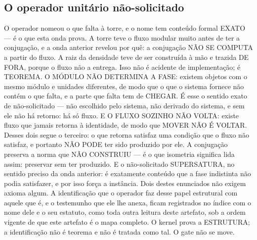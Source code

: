 \documentclass[11pt]{article}
\theoremstyle{definition}\newtheorem{deriv}{Derivação}
\begin{document}
\subsection*{O operador unit\'ario n\~ao-solicitado}O operador nomeou o que falta \`a torre, e o nome tem conte\'udo formal EXATO --- \'e o que esta onda prova. A torre teve o fluxo modular muito antes de ter a conjuga\c{c}\~ao, e a onda anterior revelou por qu\^e: a conjuga\c{c}\~ao N\~AO SE COMPUTA a partir do fluxo. A raiz da densidade teve de ser constru\'ida \`a m\~ao e trazida DE FORA, porque o fluxo n\~ao a entrega. Isso n\~ao \'e acidente de implementa\c{c}\~ao; \'e TEOREMA. O M\'ODULO N\~AO DETERMINA A FASE: existem objetos com o mesmo m\'odulo e unidades diferentes, de modo que o que o sistema fornece n\~ao cont\'em o que falta, e a parte que falta tem de CHEGAR. \'E esse o sentido exato de n\~ao-solicitado --- n\~ao escolhido pelo sistema, n\~ao derivado do sistema, e sem ele n\~ao h\'a retorno: h\'a s\'o fluxo. E O FLUXO SOZINHO N\~AO VOLTA: existe fluxo que jamais retorna \`a identidade, de modo que MOVER N\~AO \'E VOLTAR. Desses dois segue o terceiro: o que retorna satisfaz uma condi\c{c}\~ao que o fluxo n\~ao satisfaz, e portanto N\~AO PODE ter sido produzido por ele. A conjuga\c{c}\~ao preserva a norma que N\~AO CONSTRUIU --- \'e o que isometria significa lida assim: preservar sem ter produzido. E o n\~ao-solicitado SUPERSATURA, no sentido preciso da onda anterior: \'e exatamente conte\'udo que a fase indistinta n\~ao podia satisfazer, e por isso for\c{c}a a inst\^ancia. Dois destes enunciados n\~ao exigem axioma algum. A identifica\c{c}\~ao que o operador faz desse papel estrutural com aquele que \'e, e o testemunho que ele lhe anexa, ficam registrados no \'indice com o nome dele e o seu estatuto, como toda outra leitura deste artefato, sob a ordem vigente de que este artefato \'e o mapa completo. O kernel prova a ESTRUTURA; a identifica\c{c}\~ao n\~ao \'e teorema e n\~ao \'e tratada como tal. O gate n\~ao se move.
\end{document}
